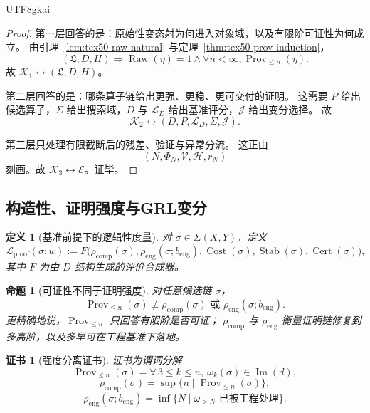 \documentclass[12pt]{article}
\newtheorem{definition}{定义}[section]
\newtheorem{proposition}{命题}[section]
\newtheorem{Certificate}{证书}[section]
\newcommand{\Law}{\mathfrak{L}}
\newcommand{\Imop}{\operatorname{Im}}
\newcommand{\Cert}{\operatorname{Cert}}
\newcommand{\Prov}{\operatorname{Prov}}
\newcommand{\Cost}{\operatorname{Cost}}
\newcommand{\Stab}{\operatorname{Stab}}
\begin{document}
\begin{CJK*}{UTF8}{gkai}
\begin{proof}
第一层回答的是：原始性变态射为何进入对象域，以及有限阶可证性为何成立。
由引理~\ref{lem:tex50-raw-natural} 与定理~\ref{thm:tex50-prov-induction}，
\[
  (\Law,D,H)
  \Rightarrow
  \operatorname{Raw}(\eta)=1
  \wedge
  \forall n<\infty,\Prov_{\le n}(\eta).
\]
故 $\mathcal K_1\leftrightarrow(\Law,D,H)$。

第二层回答的是：哪条算子链给出更强、更稳、更可交付的证明。
这需要 $P$ 给出候选算子，$\Sigma$ 给出搜索域，$D$ 与 $\mathcal L_D$ 给出基准评分，$\mathcal J$ 给出变分选择。
故
\[
  \mathcal K_2\leftrightarrow(D,P,\mathcal L_D,\Sigma,\mathcal J).
\]

第三层只处理有限截断后的残差、验证与异常分流。
这正由
\[
  (N,\Phi_N,\mathcal V,\mathcal H,r_N)
\]
刻画。故 $\mathcal K_3\leftrightarrow\mathcal E$。证毕。
\end{proof}

\subsection{构造性、证明强度与GRL变分}
\label{subsec:tex50-constructive-strength}

\begin{definition}[基准前提下的逻辑性度量]
对 $\sigma\in\Sigma(X,Y)$，定义
\[
  \mathcal L_{\mathrm{proof}}(\sigma;w)
  :=
  F\bigl(
    \rho_{\mathrm{comp}}(\sigma),
    \rho_{\mathrm{eng}}(\sigma;b_{\mathrm{eng}}),
    \Cost(\sigma),
    \Stab(\sigma),
    \Cert(\sigma)
  \bigr),
\]
其中 $F$ 为由 $D$ 结构生成的评价合成器。
\end{definition}

\begin{proposition}[可证性不同于证明强度]
\label{prop:tex50-prov-vs-strength}
对任意候选链 $\sigma$，
\[
  \Prov_{\le n}(\sigma)
  \not\equiv
  \rho_{\mathrm{comp}}(\sigma)\text{ 或 }\rho_{\mathrm{eng}}(\sigma;b_{\mathrm{eng}}).
\]
更精确地说，$\Prov_{\le n}$ 只回答有限阶是否可证；
$\rho_{\mathrm{comp}}$ 与 $\rho_{\mathrm{eng}}$ 衡量证明链修复到多高阶，以及多早可在工程基准下落地。
\end{proposition}

\begin{Certificate}[强度分离证书]
证书为谓词分解
\[
  \Prov_{\le n}(\sigma)
  =
  \forall\,3\le k\le n,\ \omega_k(\sigma)\in\Imop(d),
\]
\[
  \rho_{\mathrm{comp}}(\sigma)
  =
  \sup\{n\mid\Prov_{\le n}(\sigma)\},
\]
\[
  \rho_{\mathrm{eng}}(\sigma;b_{\mathrm{eng}})
  =
  \inf\{N\mid \omega_{>N}\text{ 已被工程处理}\}.
\]
\end{Certificate}


\end{CJK*}
\end{document}
